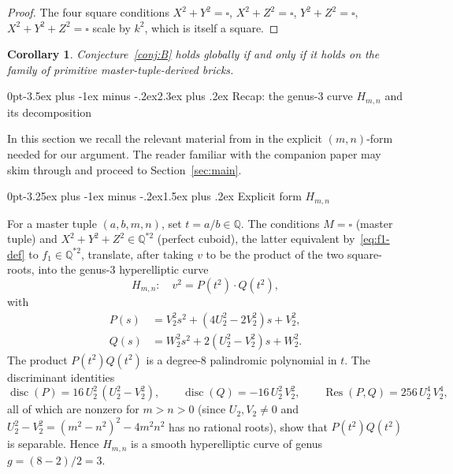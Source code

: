 \documentclass[12pt,a4paper,reqno]{amsart}
\makeatletter
\renewcommand{\section}{\@startsection{section}{1}%
  {0pt}{-3.5ex plus -1ex minus -.2ex}{2.3ex plus .2ex}%
  {\normalfont\large\bfseries}}
\renewcommand{\subsection}{\@startsection{subsection}{2}%
  {0pt}{-3.25ex plus -1ex minus -.2ex}{1.5ex plus .2ex}%
  {\normalfont\normalsize\bfseries}}
\theoremstyle{plain}
\newtheorem{corollary}[theorem]{Corollary}
\theoremstyle{definition}
\theoremstyle{remark}
\newcommand{\Q}{\mathbb{Q}}
\newcommand{\HC}{H_{m,n}}
\DeclareMathOperator{\disc}{disc}
\DeclareMathOperator{\Res}{Res}
\makeatother
\begin{document}
\begin{proof}
The four square conditions $X^2 + Y^2 = \square$, $X^2 + Z^2 = \square$, $Y^2 + Z^2 = \square$, $X^2 + Y^2 + Z^2 = \square$ scale by $k^2$, which is itself a square.
\end{proof}

\begin{corollary}
Conjecture~\ref{conj:B} holds globally if and only if it holds on the family of primitive master-tuple-derived bricks.
\end{corollary}

\section{Recap: the genus-3 curve $\HC$ and its decomposition}
\label{sec:genus3}

In this section we recall the relevant material from \cite[\S 3--4]{peschmann-paper1} in the explicit $(m, n)$-form needed for our argument. The reader familiar with the companion paper may skim through and proceed to Section~\ref{sec:main}.

\subsection{Explicit form $\HC$}
\label{ssec:explicit-form}

For a master tuple $(a, b, m, n)$, set $t = a/b \in \Q$. The conditions $M = \square$ (master tuple) and $X^2 + Y^2 + Z^2 \in \Q^{*2}$ (perfect cuboid), the latter equivalent by~\eqref{eq:f1-def} to $f_1 \in \Q^{*2}$, translate, after taking $v$ to be the product of the two square-roots, into the genus-$3$ hyperelliptic curve
$$
\HC: \quad v^2 = P(t^2) \cdot Q(t^2),
$$
with
\begin{align*}
P(s) &= V_2^2 s^2 + (4 U_2^2 - 2 V_2^2) s + V_2^2, \\
Q(s) &= W_2^2 s^2 + 2 (U_2^2 - V_2^2) s + W_2^2.
\end{align*}
The product $P(t^2) Q(t^2)$ is a degree-$8$ palindromic polynomial in $t$.
The discriminant identities
$$
\disc(P) = 16\, U_2^2 \, (U_2^2 - V_2^2),
\qquad
\disc(Q) = -16\, U_2^2 \, V_2^2,
\qquad
\Res(P, Q) = 256\, U_2^4 \, V_2^4,
$$
all of which are nonzero for $m > n > 0$ (since $U_2, V_2 \neq 0$ and
$U_2^2 - V_2^2 = (m^2-n^2)^2 - 4m^2 n^2$ has no rational roots), show that
$P(t^2) Q(t^2)$ is separable. Hence $\HC$ is a smooth hyperelliptic curve
of genus $g = (8-2)/2 = 3$.
\end{document}
